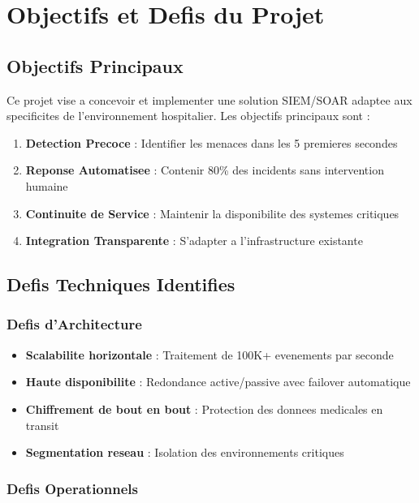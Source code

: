 \section{Objectifs et Defis du Projet}

\subsection{Objectifs Principaux}

Ce projet vise a concevoir et implementer une solution SIEM/SOAR adaptee aux specificites de l'environnement hospitalier. Les objectifs principaux sont :

\begin{enumerate}
    \item \textbf{Detection Precoce} : Identifier les menaces dans les 5 premieres secondes
    \item \textbf{Reponse Automatisee} : Contenir 80\% des incidents sans intervention humaine
    \item \textbf{Continuite de Service} : Maintenir la disponibilite des systemes critiques
    \item \textbf{Integration Transparente} : S'adapter a l'infrastructure existante
\end{enumerate}

\subsection{Defis Techniques Identifies}

\subsubsection{Defis d'Architecture}

\begin{itemize}
    \item \textbf{Scalabilite horizontale} : Traitement de 100K+ evenements par seconde
    \item \textbf{Haute disponibilite} : Redondance active/passive avec failover automatique
    \item \textbf{Chiffrement de bout en bout} : Protection des donnees medicales en transit
    \item \textbf{Segmentation reseau} : Isolation des environnements critiques
\end{itemize}

\subsubsection{Defis Operationnels}

